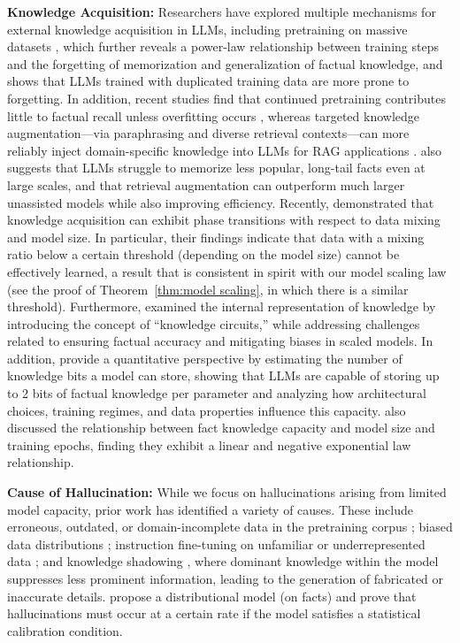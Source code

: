 \documentclass[11pt]{article}
\theoremstyle{plain}
\theoremstyle{definition}
\begin{document}
\vspace{0.1cm}
\noindent
{\bf Knowledge Acquisition:}
Researchers have explored multiple mechanisms for external knowledge acquisition in LLMs, including pretraining on massive datasets \citep{chang2024large}, which further reveals a power-law relationship between training steps and the forgetting of memorization and generalization of factual knowledge, and shows that LLMs trained with duplicated training data are more prone to forgetting. In addition, recent studies find that continued pretraining contributes little to factual recall unless overfitting occurs \citep{hoffbauer2024knowledge}, whereas targeted knowledge augmentation—via paraphrasing and diverse retrieval contexts—can more reliably inject domain-specific knowledge into LLMs for RAG applications \citep{bhushan2025systematic}. \citet{mallen2023not} also suggests that LLMs struggle to memorize less popular, long-tail facts even at large scales, and that retrieval augmentation can outperform much larger unassisted models while also improving efficiency. Recently, \citet{gu2025data} demonstrated that knowledge acquisition can exhibit phase transitions with respect to data mixing and model size. In particular, their findings indicate that data with a mixing ratio below a certain threshold (depending on the model size) cannot be effectively learned, a result that is consistent in spirit with our model scaling law (see the proof of Theorem~\ref{thm:model scaling}, in which there is a similar threshold).
Furthermore, \citet{ou2025llms} examined the internal representation of knowledge by introducing the concept of “knowledge circuits,” while addressing challenges related to ensuring factual accuracy and mitigating biases in scaled models. In addition, \citet{allen2024physics} provide a quantitative perspective by estimating the number of knowledge bits a model can store, showing that LLMs are capable of storing up to 2 bits of factual knowledge per parameter and analyzing how architectural choices, training regimes, and data properties influence this capacity. \citet{lu2024scaling} also discussed the relationship between fact knowledge capacity and model size and training epochs, finding they exhibit a linear and negative exponential law relationship.

\vspace{0.1cm}
\noindent
{\bf Cause of Hallucination:} While we focus on hallucinations arising from limited model capacity, prior work has identified a variety of causes. These include erroneous, outdated, or domain-incomplete data in the pretraining corpus \citep{zhang2023vibe}; biased data distributions \citep{ladhak2023pre}; instruction fine-tuning on unfamiliar or underrepresented data \citep{kang2025unfamiliar}; and knowledge shadowing \citep{zhang-etal-2025-law}, where dominant knowledge within the model suppresses less prominent information, leading to the generation of fabricated or inaccurate details.
\cite{kalai2024calibrated} propose a distributional model (on facts) and 
prove that hallucinations must occur at a certain rate if the model satisfies a statistical calibration condition. 
\end{document}
